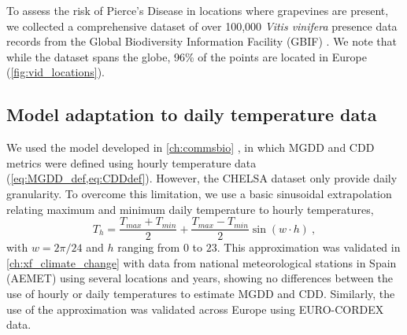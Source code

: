 To assess the risk of Pierce's Disease in locations where grapevines are
present, we collected a comprehensive dataset of over 100,000 \textit{Vitis
    vinifera} presence data records from the Global Biodiversity Information
Facility (GBIF) \cite{noauthor_what_nodate,GBIF}. We note that while the
dataset spans the globe, 96\% of the points are located in Europe
(\cref{fig:vid_locations}).

\subsection{Model adaptation to daily temperature data}

We used the model developed in \cref{ch:commsbio}
\cite{GimenezRomero2022_CommsBio}, in which MGDD and CDD metrics were defined
using hourly temperature data (\cref{eq:MGDD_def,eq:CDDdef}). However, the
CHELSA
dataset only provide daily granularity. To overcome this limitation, we use a
basic sinusoidal extrapolation relating maximum and minimum daily temperature
to hourly temperatures,
\begin{equation}
    T_h=\frac{T_{max}+T_{min}}{2} + \frac{T_{max}-T_{min}}{2}\sin(w\cdot h)
    \ ,
\end{equation}
with $w=2\pi/24$ and $h$ ranging from $0$ to $23$. This approximation was
validated in \cref{ch:xf_climate_change} \cite{GimenezRomero2023_PD} with data
from national meteorological stations in Spain (AEMET) using several locations
and years, showing no differences between the use of hourly or daily
temperatures to estimate MGDD and CDD. Similarly, the use of the approximation
was validated across Europe using EURO-CORDEX data.